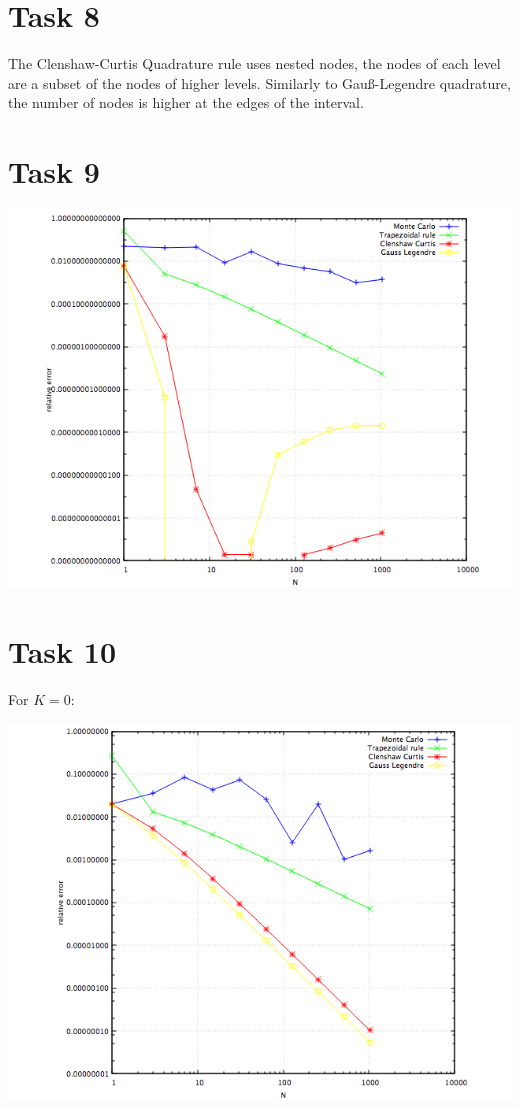 \documentclass[10pt,a4paper]{article}
\begin{document}
\section*{Task 8}

The Clenshaw-Curtis Quadrature rule uses nested nodes, the nodes of each level are a subset of the nodes of higher levels. Similarly to Gauß-Legendre quadrature, the number of nodes is higher at the edges of the interval. 

\section*{Task 9}

\begin{center}
\includegraphics[scale=0.5]{Task_9.png}		
\end{center}	

\section*{Task 10}

For $K=0$:
\begin{center}
\includegraphics[scale=0.5]{relative_errors_K0.png}		
\end{center}	
\end{document}
